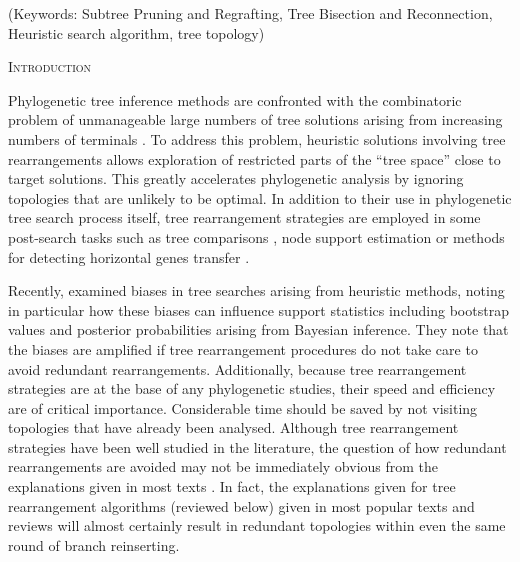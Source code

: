 \documentclass[12pt,letterpaper]{article}
\renewcommand{\section}[1]{%
\bigskip
\begin{center}
\begin{Large}
\normalfont\scshape #1
\medskip
\end{Large}
\end{center}}
\begin{document}
\noindent (Keywords: Subtree Pruning and Regrafting, Tree Bisection and Reconnection, Heuristic search algorithm, tree topology)\\

\vspace{1.5in}

\newpage 

%
%
\section{Introduction}

Phylogenetic tree inference methods are confronted with the combinatoric problem of unmanageable large numbers of tree solutions arising from increasing numbers of terminals \citep{Felsenstein:1978vh}.
To address this problem, heuristic solutions involving tree rearrangements allows exploration of restricted parts of the ``tree space'' close to target solutions.
This greatly accelerates phylogenetic analysis by ignoring topologies that are unlikely to be optimal.
In addition to their use in phylogenetic tree search process itself, tree rearrangement strategies are employed in some post-search tasks such as tree comparisons \citep[e.g.][]{allen2001subtree,kuhner2015treComparison}, node support estimation \citep[e.g.][]{goloboff2014bias} or methods for detecting horizontal genes transfer \citep[e.g.][]{mcfadden1995something,bordewich2005computational}.

Recently, \citet{goloboff2014bias} examined biases in tree searches arising from heuristic methods, noting in particular how these biases can influence support statistics including bootstrap values and posterior probabilities arising from Bayesian inference.
They note that the biases are amplified if tree rearrangement %
procedures do not take care to avoid redundant rearrangements. %
Additionally, because tree rearrangement strategies are at the base of any phylogenetic studies, their speed and efficiency are of critical importance.
Considerable time should be saved by not visiting topologies that have already been analysed.
Although tree rearrangement strategies have been well studied in the literature, the question of how redundant rearrangements are avoided may not be immediately obvious from the explanations given in most texts \citep{swofford2003phylogeny,felsenstein2004inferring,wiley2011phylogenetics}.
In fact, the explanations given for tree rearrangement algorithms (reviewed below) given in most popular texts and reviews will almost certainly result in redundant topologies within even the same round of branch reinserting.
\end{document}
